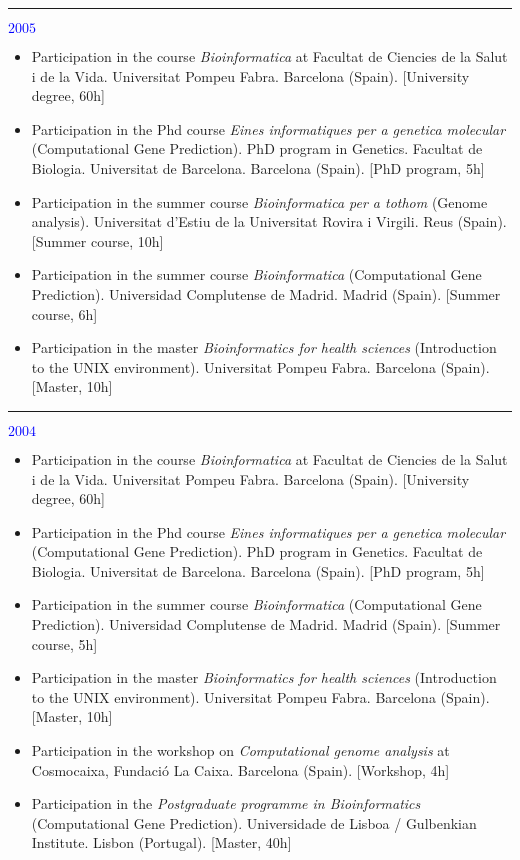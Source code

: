 \textcolor{blue}{\rule{3mm}{3mm}{\Large $2005$}}
\begin{itemize}
\item Participation in the course \emph{Bioinformatica} at Facultat de Ciencies
de la Salut i de la Vida. Universitat Pompeu Fabra. Barcelona (Spain). [University degree, 60h]

\item Participation in the Phd course \emph{Eines informatiques per a genetica molecular} 
(Computational Gene Prediction). PhD program in Genetics. Facultat de Biologia. Universitat de 
Barcelona. Barcelona (Spain). [PhD program, 5h]

\item Participation in the summer course \emph{Bioinformatica per a tothom} (Genome analysis). 
Universitat d'Estiu de la Universitat Rovira i Virgili. Reus (Spain). [Summer course, 10h] 

\item Participation in the summer course \emph{Bioinformatica} (Computational Gene Prediction). 
Universidad Complutense de Madrid. Madrid (Spain). [Summer course, 6h] 

\item Participation in the master \emph{Bioinformatics for health sciences} (Introduction to 
the UNIX environment). Universitat Pompeu Fabra. Barcelona (Spain). [Master, 10h]\\
\end{itemize}

\textcolor{blue}{\rule{3mm}{3mm}{\Large $2004$}}
\begin{itemize}
\item Participation in the course \emph{Bioinformatica} at Facultat de Ciencies
de la Salut i de la Vida. Universitat Pompeu Fabra. Barcelona (Spain). [University degree, 60h]

\item Participation in the Phd course \emph{Eines informatiques per a genetica molecular} 
(Computational Gene Prediction). PhD program in Genetics. Facultat de Biologia. Universitat de 
Barcelona. Barcelona (Spain). [PhD program, 5h]

\item Participation in the summer course \emph{Bioinformatica} (Computational Gene Prediction). 
Universidad Complutense de Madrid. Madrid (Spain). [Summer course, 5h]

\item Participation in the master \emph{Bioinformatics for health sciences} (Introduction to 
the UNIX environment). Universitat Pompeu Fabra. Barcelona (Spain). [Master, 10h] 

\item Participation in the workshop on \emph{Computational genome analysis} at Cosmocaixa,
Fundaci\'o La Caixa. Barcelona (Spain). [Workshop, 4h] 

\item Participation in the \emph{Postgraduate programme in Bioinformatics} (Computational Gene 
Prediction). Universidade de Lisboa / Gulbenkian Institute. Lisbon (Portugal). [Master, 40h]\\ 
\end{itemize}

